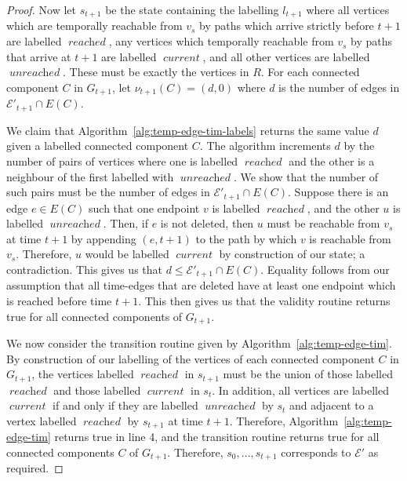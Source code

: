 \documentclass[a4paper,UKenglish,cleveref, autoref, thm-restate]{lipics-v2021} %
\DeclareMathOperator{\reached}{\textit{reached}}
\DeclareMathOperator{\unreached}{\textit{unreached}}
\DeclareMathOperator{\current}{\textit{current}}
\begin{document}
\begin{toappendix}
\begin{proof}
    Now let $s_{t+1}$ be the state containing the labelling $l_{t+1}$ where all vertices which are temporally reachable from $v_s$ by paths which arrive strictly before $t+1$ are labelled $\reached$, any vertices which temporally reachable from $v_s$ by paths that arrive at $t+1$ are labelled $\current$, and all other vertices are labelled $\unreached$. These must be exactly the vertices in $R$.
    For each connected component $C$ in $G_{t+1}$, let $\nu_{t+1}(C)=(d,0)$ where $d$ is the number of edges in $\mathcal{E}'_{t+1}\cap E(C)$. 
    
    We claim that Algorithm~\ref{alg:temp-edge-tim-labels} returns the same value $d$ given a labelled connected component $C$. The algorithm increments $d$ by the number of pairs of vertices where one is labelled $\reached$ and the other is a neighbour of the first labelled with $\unreached$. We show that the number of such pairs must be the number of edges in $\mathcal{E}'_{t+1}\cap E(C)$.
    Suppose there is an edge $e\in E(C)$ such that one endpoint $v$ is labelled $\reached$, and the other $u$ is labelled $\unreached$. Then, if $e$ is not deleted, then $u$ must be reachable from $v_s$ at time $t+1$ by appending $(e,t+1)$ to the path by which $v$ is reachable from $v_s$. Therefore, $u$ would be labelled $\current$ by construction of our state; a contradiction. This gives us that $d\leq \mathcal{E}'_{t+1}\cap E(C)$. Equality follows from our assumption that all time-edges that are deleted have at least one endpoint which is reached before time $t+1$. This then gives us that the validity routine returns true for all connected components of $G_{t+1}$.
    
    We now consider the transition routine given by Algorithm~\ref{alg:temp-edge-tim}. By construction of our labelling of the vertices of each connected component $C$ in $G_{t+1}$, the vertices labelled $\reached$ in $s_{t+1}$ must be the union of those labelled $\reached$ and those labelled $\current$ in $s_t$. In addition, all vertices are labelled $\current$ if and only if they are labelled $\unreached$ by $s_t$ and adjacent to a vertex labelled $\reached$ by $s_{t+1}$ at time $t+1$. Therefore, Algorithm~\ref{alg:temp-edge-tim} returns true in line 4, and the transition routine returns true for all connected components $C$ of $G_{t+1}$.
    Therefore, $s_0,\ldots,s_{t+1}$ corresponds to $\mathcal{E}'$ as required.


\end{proof}
\end{toappendix}
\end{document}
